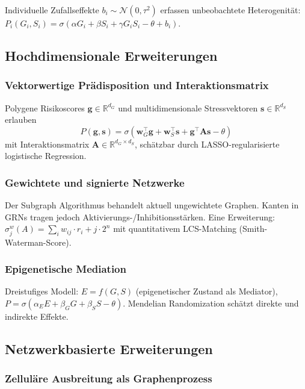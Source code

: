 ﻿\documentclass[12pt, a4paper]{article}
\theoremstyle{definition}
\theoremstyle{remark}
\newcommand{\R}{\mathbb{R}}
\begin{document}
Individuelle Zufallseffekte $b_i \sim \mathcal{N}(0,\tau^2)$ erfassen
unbeobachtete Heterogenität:
$P_i(G_i, S_i) = \sigma(\alpha G_i + \beta S_i + \gamma G_i S_i - \theta + b_i)$.

\subsection{Hochdimensionale Erweiterungen}

\subsubsection{Vektorwertige Prädisposition und Interaktionsmatrix}

Polygene Risikoscores $\mathbf{g} \in \R^{d_G}$ und multidimensionale
Stressvektoren $\mathbf{s} \in \R^{d_S}$ erlauben
\[
  P(\mathbf{g},\mathbf{s}) = \sigma(\mathbf{w}_G^\top \mathbf{g}
  + \mathbf{w}_S^\top \mathbf{s} + \mathbf{g}^\top \mathbf{A} \mathbf{s} - \theta)
\]
mit Interaktionsmatrix $\mathbf{A} \in \R^{d_G \times d_S}$,
schätzbar durch LASSO-regularisierte logistische Regression.

\subsubsection{Gewichtete und signierte Netzwerke}

Der Subgraph Algorithmus behandelt aktuell ungewichtete Graphen. Kanten in GRNs
tragen jedoch Aktivierungs-/Inhibitionsstärken. Eine Erweiterung:
$\sigma_j^w(A) = \sum_i w_{ij} \cdot r_i + j \cdot 2^n$ mit
quantitativem LCS-Matching (Smith-Waterman-Score).

\subsubsection{Epigenetische Mediation}

Dreistufiges Modell: $E = f(G, S)$ (epigenetischer Zustand als Mediator),
$P = \sigma(\alpha_E E + \beta_G G + \beta_S S - \theta)$.
Mendelian Randomization schätzt direkte und indirekte Effekte.

\subsection{Netzwerkbasierte Erweiterungen}

\subsubsection{Zelluläre Ausbreitung als Graphenprozess}
\end{document}
